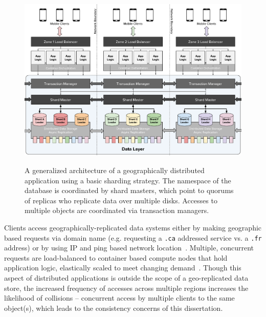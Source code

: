 \begin{figure}
    \begin{center}
        \includegraphics[width=5in]{figures/ch02_distributed_architecture.pdf}
    \end{center}
    \renewcommand{\baselinestretch}{1}
    \small\normalsize

    \begin{quote}
        \caption[A Generalized Geo-Distributed System Architecture]{A generalized architecture of a geographically distributed application using a basic sharding strategy. The namespace of the database is coordinated by shard masters, which point to quorums of replicas who replicate data over multiple disks. Accesses to multiple objects are coordinated via transaction managers.}
        \label{fig:ch02_distributed_architecture}
    \end{quote}
\end{figure}
\renewcommand{\baselinestretch}{2}
\small\normalsize

Clients access geographically-replicated data systems either by making geographic based requests via domain name (e.g. requesting a \texttt{.ca} addressed service vs. a \texttt{.fr} address) or by using IP and ping based network location~\cite{geoping}.
Multiple, concurrent requests are load-balanced to container based compute nodes that hold application logic, elastically scaled to meet changing demand~\cite{load_balancing}.
Though this aspect of distributed applications is outside the scope of a geo-replicated data store, the increased frequency of accesses across multiple regions increases the likelihood of collisions -- concurrent access by multiple clients to the same object(s), which leads to the consistency concerns of this dissertation.

